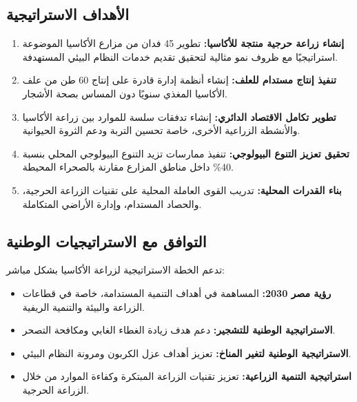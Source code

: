 \subsection{الأهداف الاستراتيجية}

\begin{enumerate}
    \item \textbf{إنشاء زراعة حرجية منتجة للأكاسيا:} تطوير 45 فدان من مزارع الأكاسيا الموضوعة استراتيجيًا مع ظروف نمو مثالية لتحقيق تقديم خدمات النظام البيئي المستهدفة.
    
    \item \textbf{تنفيذ إنتاج مستدام للعلف:} إنشاء أنظمة إدارة قادرة على إنتاج 60 طن من علف الأكاسيا المغذي سنويًا دون المساس بصحة الأشجار.
    
    \item \textbf{تطوير تكامل الاقتصاد الدائري:} إنشاء تدفقات سلسة للموارد بين زراعة الأكاسيا والأنشطة الزراعية الأخرى، خاصة تحسين التربة ودعم الثروة الحيوانية.
    
    \item \textbf{تحقيق تعزيز التنوع البيولوجي:} تنفيذ ممارسات تزيد التنوع البيولوجي المحلي بنسبة 40\% داخل مناطق المزارع مقارنة بالصحراء المحيطة.
    
    \item \textbf{بناء القدرات المحلية:} تدريب القوى العاملة المحلية على تقنيات الزراعة الحرجية، والحصاد المستدام، وإدارة الأراضي المتكاملة.
\end{enumerate}

\subsection{التوافق مع الاستراتيجيات الوطنية}

تدعم الخطة الاستراتيجية لزراعة الأكاسيا بشكل مباشر:

\begin{itemize}
    \item \textbf{رؤية مصر 2030:} المساهمة في أهداف التنمية المستدامة، خاصة في قطاعات الزراعة والبيئة والتنمية الريفية.
    
    \item \textbf{الاستراتيجية الوطنية للتشجير:} دعم هدف زيادة الغطاء الغابي ومكافحة التصحر.
    
    \item \textbf{الاستراتيجية الوطنية لتغير المناخ:} تعزيز أهداف عزل الكربون ومرونة النظام البيئي.
    
    \item \textbf{استراتيجية التنمية الزراعية:} تعزيز تقنيات الزراعة المبتكرة وكفاءة الموارد من خلال الزراعة الحرجية.
\end{itemize}

